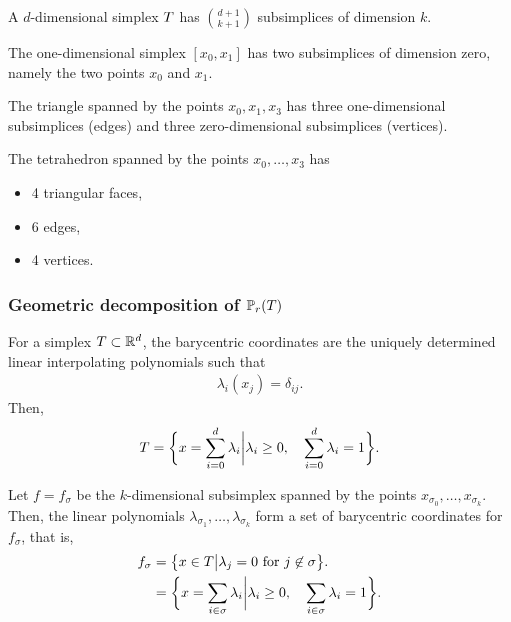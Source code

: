 \begin{example}
  A $d$-dimensional simplex $T$ has $\binom{d+1}{k+1}$
  subsimplices of dimension $k$.

  The one-dimensional simplex $[x_0,x_1]$ has two subsimplices of
  dimension zero, namely the two points $x_0$ and $x_1$.

  The triangle spanned by the points $x_0, x_1, x_3$ has three
  one-dimensional subsimplices (edges) and three zero-dimensional
  subsimplices (vertices).

  The tetrahedron spanned by the points $x_0,\dots,x_3$ has
  \begin{itemize}
  \item 4 triangular faces,
  \item 6 edges,
  \item 4 vertices.
  \end{itemize}
\end{example}

\subsubsection{Geometric decomposition of $\mathbb P_r(T)$}

\begin{remark}
  For a simplex $T\subset\mathbb R^d$, the barycentric coordinates are
  the uniquely determined linear interpolating polynomials such that
  \begin{gather*}
    \lambda_i(x_j) = \delta_{ij}.
  \end{gather*}
  Then,
  \begin{gather*}
    T = \biggl\{ x = \sum_{i=0}^d\lambda_i\bigg\vert
    \lambda_i \ge 0,\quad\sum_{i=0}^d\lambda_i = 1\biggr\}.
  \end{gather*}

  Let $f=f_\sigma$ be the $k$-dimensional subsimplex spanned by the
  points $x_{\sigma_0},\dots,x_{\sigma_k}$. Then, the linear
  polynomials $\lambda_{\sigma_1},\dots,\lambda_{\sigma_k}$ form a set
  of barycentric coordinates for $f_\sigma$, that is,
  \begin{gather}
    \begin{split}
      f_\sigma &= \bigl\{x\in T \big\vert
      \lambda_j=0 \text{ for } j\not\in\sigma\bigr\}.
      \\
      &= \biggl\{ x = \sum_{i\in\sigma}\lambda_i\bigg\vert
    \lambda_i \ge 0,\quad\sum_{i\in\sigma}\lambda_i = 1\biggr\}.
    \end{split}
  \end{gather}
\end{remark}


